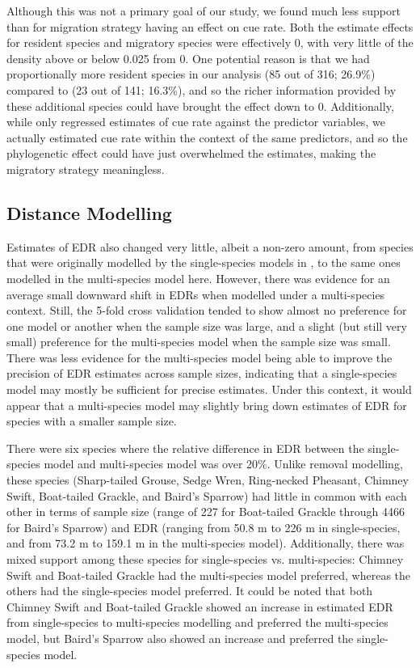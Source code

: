 \documentclass[12pt]{article}
\begin{document}
\par Although this was not a primary goal of our study, we found much less support than \citet{solymos_phylogeny_2018} for migration strategy having an effect on cue rate.
Both the estimate effects for resident species and migratory species were effectively 0, with very little of the density above or below 0.025 from 0.
One potential reason is that we had proportionally more resident species in our analysis (85 out of 316; 26.9\%) compared to \citet{solymos_phylogeny_2018} (23 out of 141; 16.3\%), and so the richer information provided by these additional species could have brought the effect down to 0.
Additionally, while \citet{solymos_phylogeny_2018} only regressed estimates of cue rate against the predictor variables, we actually estimated cue rate within the context of the same predictors, and so the phylogenetic effect could have just overwhelmed the estimates, making the migratory strategy meaningless.

\subsection{Distance Modelling}
\par Estimates of EDR also changed very little, albeit a non-zero amount, from species that were originally modelled by the single-species models in \citet{edwards_point_2023}, to the same ones modelled in the multi-species model here.
However, there was evidence for an average small downward shift in EDRs when modelled under a multi-species context.
Still, the 5-fold cross validation tended to show almost no preference for one model or another when the sample size was large, and a slight (but still very small) preference for the multi-species model when the sample size was small.
There was less evidence for the multi-species model being able to improve the precision of EDR estimates across sample sizes, indicating that a single-species model may mostly be sufficient for precise estimates.
Under this context, it would appear that a multi-species model may slightly bring down estimates of EDR for species with a smaller sample size.

\par There were six species where the relative difference in EDR between the single-species model and multi-species model was over 20\%. 
Unlike removal modelling, these species (Sharp-tailed Grouse, Sedge Wren, Ring-necked Pheasant, Chimney Swift, Boat-tailed Grackle, and Baird's Sparrow) had little in common with each other in terms of sample size (range of 227 for Boat-tailed Grackle through 4466 for Baird's Sparrow) and EDR (ranging from 50.8 m to 226 m in single-species, and from 73.2 m to 159.1 m in the multi-species model). 
Additionally, there was mixed support among these species for single-species vs. multi-species: Chimney Swift and Boat-tailed Grackle had the multi-species model preferred, whereas the others had the single-species model preferred.
It could be noted that both Chimney Swift and Boat-tailed Grackle showed an increase in estimated EDR from single-species to multi-species modelling and preferred the multi-species model, but Baird's Sparrow also showed an increase and preferred the single-species model.
\end{document}
